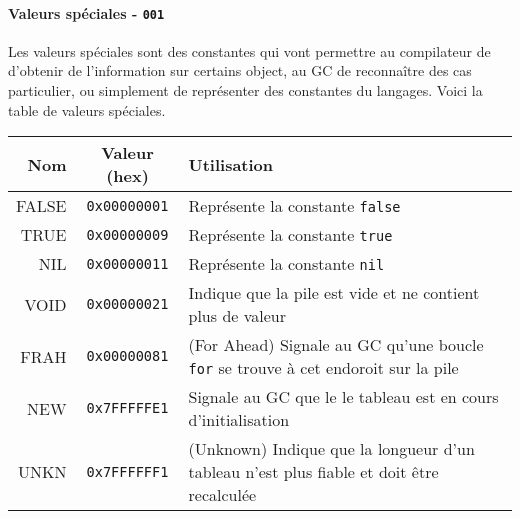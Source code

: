 \documentclass{article}
\begin{document}
\paragraph{Valeurs spéciales - \texttt{001}}
Les valeurs spéciales sont des constantes qui vont permettre au compilateur de d'obtenir de l'information sur certains object, au GC de reconnaître des cas particulier, ou simplement de représenter des constantes du langages. Voici la table de valeurs spéciales.
\begin{center}
  \begin{tabular}{r|c|p{12cm}}
    Nom & Valeur (hex) & Utilisation\\
    \hline
    FALSE & \texttt{0x00000001} & Représente la constante {\lstset{style=lua}\lstinline$false$}\\
    TRUE  & \texttt{0x00000009} & Représente la constante {\lstset{style=lua}\lstinline$true$}\\
    NIL   & \texttt{0x00000011} & Représente la constante {\lstset{style=lua}\lstinline$nil$}\\
    VOID  & \texttt{0x00000021} & Indique que la pile est vide et ne contient plus de valeur\\
    FRAH  & \texttt{0x00000081} & (For Ahead) Signale au GC qu'une boucle {\lstset{style=lua}\lstinline$for$} se trouve à cet endoroit sur la pile\\
    NEW   & \texttt{0x7FFFFFE1} & Signale au GC que le le tableau est en cours d'initialisation\\
    UNKN  & \texttt{0x7FFFFFF1} & (Unknown) Indique que la longueur d'un tableau n'est plus fiable et doit être recalculée\\
  \end{tabular}
\end{center}
\end{document}
